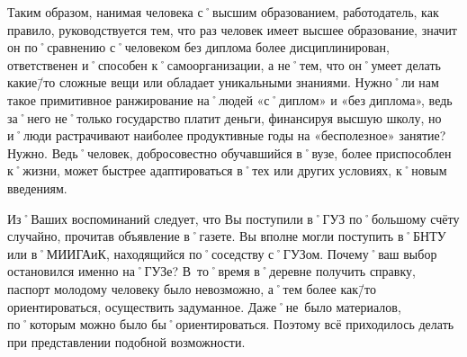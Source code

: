 \begin{drama}
Таким образом, нанимая человека с˚высшим образованием, работодатель, как правило, руководствуется тем, что раз человек имеет высшее образование, значит он по˚сравнению с˚человеком без диплома более дисциплинирован, ответственен и˚способен к˚самоорганизации, а не˚тем, что он˚умеет делать какие\=/то сложные вещи или обладает уникальными знаниями. Нужно˚ли нам такое примитивное ранжирование на˚людей  «с˚диплом» и  «без диплома», ведь за˚него не˚только государство платит деньги, финансируя высшую школу, но и˚люди растрачивают наиболее продуктивные годы на  «бесполезное» занятие?
	\michaelspeaks Нужно. Ведь˚человек, добросовестно обучавшийся в˚вузе, более приспособлен к˚жизни, может быстрее адаптироваться в˚тех или других условиях, к˚новым введениям.	
	
	\maxspeaks Из˚Ваших воспоминаний следует, что Вы поступили в˚ГУЗ по˚большому счёту случайно, прочитав объявление в˚газете. Вы вполне могли поступить в˚БНТУ или в˚МИИГАиК, находящийся по˚соседству с˚ГУЗом. Почему˚ваш выбор остановился именно на˚ГУЗе?
	\michaelspeaks В~то˚время в˚деревне получить справку, паспорт молодому человеку было невозможно, а˚тем более как\=/то ориентироваться, осуществить задуманное. Даже˚не~было материалов, по˚которым можно было бы˚ориентироваться. Поэтому всё приходилось делать при представлении подобной возможности.


\end{drama}
